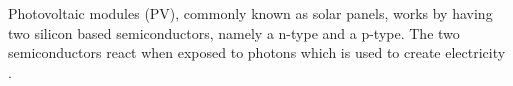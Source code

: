 Photovoltaic modules (PV), commonly known as solar panels, works by
having two silicon based semiconductors, namely a n-type and a p-type.
The two semiconductors react when exposed to photons which is used to
create electricity \cite{photovoltaic}.



